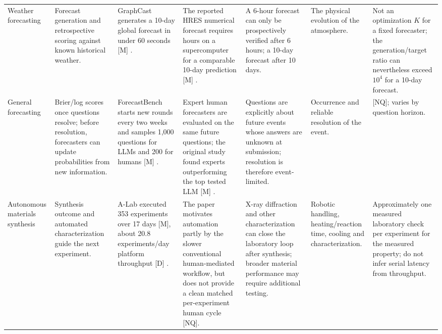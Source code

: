 \begin{landscape}
\begin{center}
\begin{longtable}{
    @{}
    p{2.0cm}
    p{3.0cm}
    p{2.85cm}
    p{2.75cm}
    p{3.05cm}
    p{2.75cm}
    p{2.55cm}
    @{}
}
\\[3pt]

Weather forecasting
&
Forecast generation and retrospective scoring against known historical
weather.
&
GraphCast generates a 10-day global forecast in under 60 seconds [M]
\parencite{lam2023graphcast}.
&
The reported HRES numerical forecast requires hours on a
supercomputer for a comparable 10-day prediction [M]
\parencite{lam2023graphcast}.
&
A 6-hour forecast can only be prospectively verified after 6 hours; a
10-day forecast after 10 days.
&
The physical evolution of the atmosphere.
&
Not an optimization $K$ for a fixed forecaster; the generation/target
ratio can nevertheless exceed $10^4$ for a 10-day forecast.

\\[3pt]

General forecasting
&
Brier/log scores once questions resolve; before resolution, forecasters
can update probabilities from new information.
&
ForecastBench starts new rounds every two weeks and samples 1,000
questions for LLMs and 200 for humans [M]
\parencite{karger2025forecastbench}.
&
Expert human forecasters are evaluated on the same future questions;
the original study found experts outperforming the top tested LLM
[M] \parencite{karger2025forecastbench}.
&
Questions are explicitly about future events whose answers are unknown
at submission; resolution is therefore event-limited.
&
Occurrence and reliable resolution of the event.
&
[NQ]; varies by question horizon.

\\[3pt]

Autonomous materials synthesis
&
Synthesis outcome and automated characterization guide the next
experiment.
&
A-Lab executed 353 experiments over 17 days [M], about
20.8 experiments/day platform throughput [D]
\parencite{szymanski2023alab}.
&
The paper motivates automation partly by the slower conventional
human-mediated workflow, but does not provide a clean matched
per-experiment human cycle [NQ].
&
X-ray diffraction and other characterization can close the laboratory
loop after synthesis; broader material performance may require
additional testing.
&
Robotic handling, heating/reaction time, cooling and characterization.
&
Approximately one measured laboratory check per experiment for the
measured property; do not infer serial latency from throughput.

\\[3pt]


\end{longtable}
\end{center}
\end{landscape}
